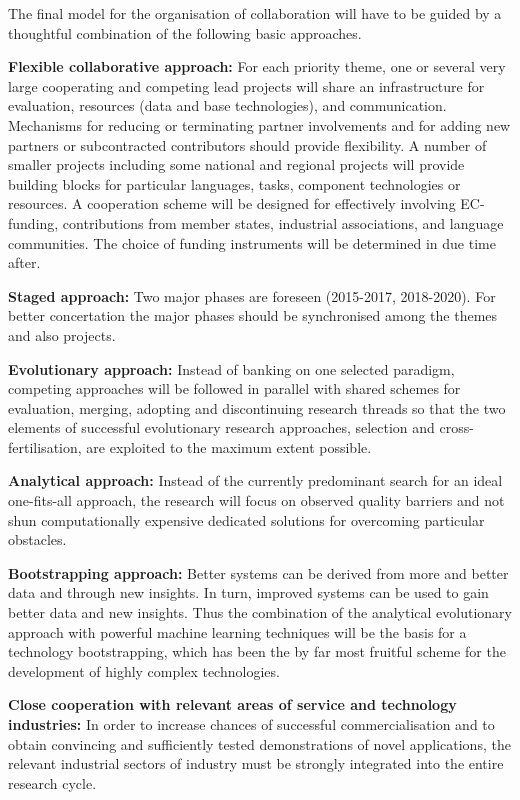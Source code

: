 \documentclass[10pt, plain]{../../metanetpaper}
\begin{document}
\begin{multicols}{2}
The final model for the organisation of collaboration will have to be guided by a thoughtful combination of the following basic approaches.


\textbf{Flexible collaborative approach:} For each priority theme, one or several very large cooperating and competing lead projects will share an infrastructure for evaluation, resources (data and base technologies), and communication. Mechanisms for reducing or terminating partner involvements and for adding new partners or subcontracted contributors should provide flexibility. A number of smaller projects including some national and regional projects will provide building blocks for particular languages, tasks, component technologies or resources. A cooperation scheme will be designed for effectively involving EC-funding, contributions from member states, industrial associations, and language communities. The choice of funding instruments will be determined in due time after.

\textbf{Staged approach:} Two major phases are foreseen (2015-2017, 2018-2020). For better concertation the major phases should be synchronised among the themes and also projects.   

\textbf{Evolutionary approach:} Instead of banking on one selected paradigm, competing approaches will be followed in parallel with shared schemes for evaluation, merging, adopting and discontinuing research threads so that the two elements of successful evolutionary research approaches, selection and cross-fertilisation, are exploited to the maximum extent possible.

\textbf{Analytical approach:} Instead of the currently predominant search for an ideal one-fits-all approach, the research will focus on observed quality barriers and not shun computationally expensive dedicated solutions for overcoming particular obstacles.

\textbf{Bootstrapping approach:} Better systems can be derived from more and better data and through new insights. In turn, improved systems can be used to gain better data and new insights. Thus the combination of the analytical evolutionary approach with powerful machine learning techniques will be the basis for a technology bootstrapping, which has been the by far most fruitful scheme for the development of highly complex technologies.

\textbf{Close cooperation with relevant areas of service and technology industries:} In order to increase chances of successful commercialisation and to obtain convincing and sufficiently tested demonstrations of novel applications, the relevant industrial sectors of industry must be strongly integrated into the entire research cycle.


\end{multicols}
\end{document}
